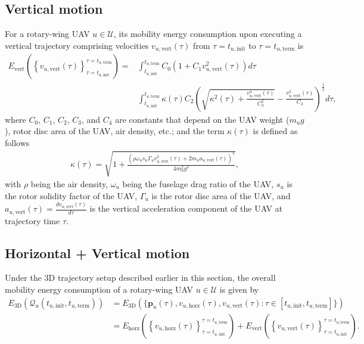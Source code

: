 \documentclass{article}
\begin{document}
\subsection{Vertical motion}
For a rotary-wing UAV $u{\in}\mathcal{U}$, its mobility energy consumption upon executing a vertical trajectory comprising velocities $v_{u,\mathrm{vert}}(\tau)$ from $\tau{=}t_{u,\mathrm{init}}$ to $\tau{=}t_{u,\mathrm{term}}$ is
\begin{align}\label{Vertical_energy}
    E_{\mathrm{vert}}\left(\left\{v_{u,\mathrm{vert}}(\tau)\right\}_{\tau{=}t_{u,\mathrm{init}}}^{\tau{=}t_{u,\mathrm{term}}}\right){=}&\int_{t_{u,\mathrm{init}}}^{t_{u,\mathrm{term}}}C_{0}\left(1{+}C_{1}v_{u,\mathrm{vert}}^{2}(\tau)\right)d\tau\\&\int_{t_{u,\mathrm{init}}}^{t_{u,\mathrm{term}}}\kappa(\tau)C_{2}\left(\sqrt{\kappa^{2}(\tau){+}\frac{v_{u,\mathrm{vert}}^{4}(\tau)}{C_{3}^{2}}}{-}\frac{v_{u,\mathrm{vert}}^{2}(\tau)}{C_{3}}\right)^{\frac{1}{2}}d\tau\nonumber,
\end{align}
where $C_{0}$, $C_{1}$, $C_{2}$, $C_{3}$, and $C_{4}$ are constants that depend on the UAV weight ($m_{u}g$), rotor disc area of the UAV, air density, etc.; and the term $\kappa(\tau)$ is defined as follows
\begin{align}\label{Kappa_term_vert}
    \kappa(\tau){=}\sqrt{1{+}\frac{\left(\rho\omega_{u}s_{u}\Gamma_{u}v_{u,\mathrm{vert}}^{2}(\tau){+}2m_{u}a_{u,\mathrm{vert}}(\tau)\right)^{2}}{4m_{u}^{2}g^{2}}},
\end{align}
with $\rho$ being the air density, $\omega_{u}$ being the fuselage drag ratio of the UAV, $s_{u}$ is the rotor solidity factor of the UAV, $\Gamma_{u}$ is the rotor disc area of the UAV, and $a_{u,\mathrm{vert}}(\tau){=}\frac{dv_{u,\mathrm{vert}}(\tau)}{d\tau}$ is the vertical acceleration component of the UAV at trajectory time $\tau$.

\subsection{Horizontal + Vertical motion}
Under the $3$D trajectory setup described earlier in this section, the overall mobility energy consumption of a rotary-wing UAV $u{\in}\mathcal{U}$ is given by
\begin{align}\label{3D_energy}
    E_{\mathrm{3D}}\left(\mathcal{Q}_{u}\left(t_{u,\mathrm{init}},t_{u,\mathrm{term}}\right)\right)&{=}E_{\mathrm{3D}}\left(\Big\{\mathbf{p}_{u}(\tau),v_{u,\mathrm{horz}}(\tau),v_{u,\mathrm{vert}}(\tau): \tau{\in}\left[t_{u,\mathrm{init}},t_{u,\mathrm{term}}\right]\Big\}\right)\\&{=}E_{\mathrm{horz}}\left(\left\{v_{u,\mathrm{horz}}(\tau)\right\}_{\tau{=}t_{u,\mathrm{init}}}^{\tau{=}t_{u,\mathrm{term}}}\right){+}E_{\mathrm{vert}}\left(\left\{v_{u,\mathrm{vert}}(\tau)\right\}_{\tau{=}t_{u,\mathrm{init}}}^{\tau{=}t_{u,\mathrm{term}}}\right)\nonumber.
\end{align}
\end{document}
